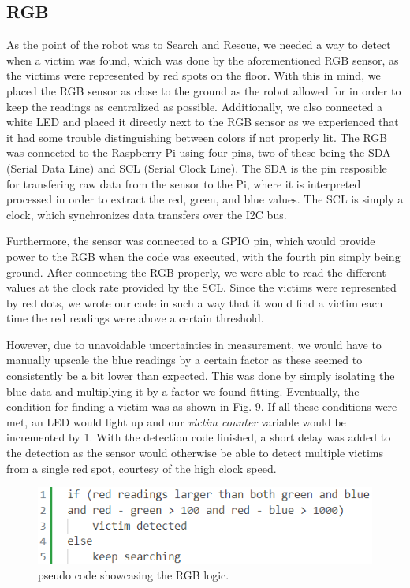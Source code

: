 \documentclass[conference]{IEEEtran}
\begin{document}
\subsection{RGB}
As the point of the robot was to Search and Rescue, we needed a way to detect when a victim was found, which was done by the aforementioned RGB sensor, as the victims were represented by red spots on the floor.
With this in mind, we placed the RGB sensor as close to the ground as the robot allowed for in order to keep the readings as centralized as possible.
Additionally, we also connected a white LED and placed it directly next to the RGB sensor as we experienced that it had some trouble distinguishing between colors if not properly lit.
The RGB was connected to the Raspberry Pi using four pins, two of these being the SDA (Serial Data Line) and SCL (Serial Clock Line)\cite{b4}. The SDA is the pin resposible for transfering raw data from the sensor to the Pi, where it is interpreted processed in order to extract the red, green, and blue values.
The SCL is simply a clock, which synchronizes data transfers over the I2C bus.

Furthermore, the sensor was connected to a GPIO pin, which would provide power to the RGB when the code was executed, with the fourth pin simply being ground.
After connecting the RGB properly, we were able to read the different values at the clock rate provided by the SCL.
Since the victims were represented by red dots, we wrote our code in such a way that it would find a victim each time the red readings were above a certain threshold.

However, due to unavoidable uncertainties in measurement, we would have to manually upscale the blue readings by a certain factor as these seemed to consistently be a bit lower than expected.
This was done by simply isolating the blue data and multiplying it by a factor we found fitting.
Eventually, the condition for finding a victim was as shown in Fig. 9.
If all these conditions were met, an LED would light up and our \textit{victim counter} variable would be incremented by 1.
With the detection code finished, a short delay was added to the detection as the sensor would otherwise be able to detect multiple victims from a single red spot, courtesy of the high clock speed.

\begin{figure}[htbp]
    \centerline{\includegraphics[width=0.9\columnwidth]{Pictures/rgbpseudo.png}}
    \caption{pseudo code showcasing the RGB logic.}
    \label{sec:rgb}
    \end{figure}
\end{document}
